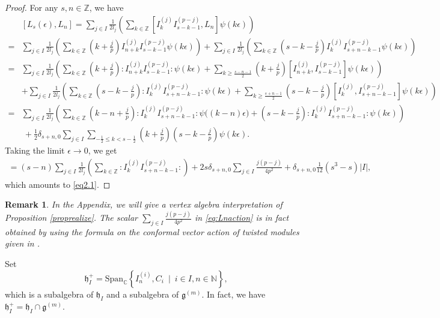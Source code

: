 \documentclass[12pt, reqno]{amsart}
\numberwithin{equation}{section}
\newtheorem{remark}[theorem]{Remark}%
\numberwithin{equation}{section}
\def\ep{\epsilon}
\def\dt{\delta}
\def\h{\mathfrak{h}}
\def\g{\mathfrak{g}}
\newcommand{\C}{\mathbb C}
\newcommand{\N}{\mathbb{N}}
\newcommand{\Z}{\mathbb{Z}}
\newcommand{\spanc}[1]{\mathrm{Span}_{\C}\left\{#1\right\}}
\newcommand{\elei}[2]{I_{#1}^{(#2)}}
\begin{document}
\begin{proof}
 For any $s,n\in\Z$, we have
 \begin{align*}
  &[L_s(\ep),L_n]=\sum_{j\in I}\frac{1}{2l_j}\left(\sum_{k\in \Z}
                 [\elei kj\elei{s-k-1}{p-j},L_n]\psi(k\ep)\right)\\
  =&\sum_{j\in I}\frac{1}{2l_j}\left(\sum_{k\in \Z}(k+\frac jp)
     \elei {n+k}j\elei{s-k-1}{p-j}\psi(k\ep)\right)+
     \sum_{j\in I}\frac{1}{2l_j}\left(\sum_{k\in \Z}(s-k-\frac jp)
      \elei {k}j\elei{s+n-k-1}{p-j}\psi(k\ep)\right)\\
  =&\sum_{j\in I}\frac{1}{2l_j}\left(\sum_{k\in \Z}(k+\frac jp)
                                :\elei {n+k}j\elei{s-k-1}{p-j}:\psi(k\ep)
                                +\sum_{k\geq\frac{s-n-1}2}(k+\frac jp)
          [\elei {n+k}j,\elei{s-k-1}{p-j}]\psi(k\ep)\right)\\
       &+\sum_{j\in I}\frac{1}{2l_j}\left(\sum_{k\in \Z}(s-k-\frac jp)
                                :\elei {k}j\elei{s+n-k-1}{p-j}:\psi(k\ep)
                                +\sum_{k\geq\frac{s+n-1}2}(s-k-\frac jp)
        [\elei {k}j,\elei{s+n-k-1}{p-j}]\psi(k\ep)\right)\\
  =&\sum_{j\in I}\frac{1}{2l_j}\left(\sum_{k\in \Z}(k-n+\frac jp)
      :\elei {k}j\elei{s+n-k-1}{p-j}:\psi\big((k-n)\ep\big)+(s-k-\frac jp)
      :\elei {k}j\elei{s+n-k-1}{p-j}:\psi(k\ep)\right)\\
          &\ +\frac12\dt_{s+n,0}
            \sum_{j\in I}\sum_{-\frac12\leq k<s-\frac12}
          (k+\frac jp)(s-k-\frac jp)\psi(k\ep).
 \end{align*}
 Taking the limit $\ep\rightarrow0$, we get
 \begin{align*}
  [L_s,L_n]=(s-n)\sum_{j\in I}\frac{1}{2l_j}\left(\sum_{k\in \Z}
                                :\elei {k}j\elei{s+n-k-1}{p-j}:\right)
    +2s\dt_{s+n,0}\sum_{j\in I}\frac{j(p-j)}{4p^2}+\dt_{s+n,0}\frac1{12}(s^3-s)|I|,
 \end{align*}
 which amounts to \eqref{eq2.1}.
\end{proof}

\begin{remark}
    In the Appendix, we will give a  vertex algebra  interpretation of Proposition \ref{proprealize}.
   The scalar $\sum_{j\in I}\frac{j(p-j)}{4p^2}$ in \eqref{eq:Lnaction} is in fact obtained by using the formula on the conformal vector action of twisted modules given in \cite[(1.14)]{KW}.
\end{remark}


Set
\[\h_I^+=\spanc{\elei ni,C_i\ \mid\ i\in I, n\in\N},\]
which is a subalgebra of $\h_I$ and a subalgebra of $\g^{(m)}$.
In fact, we have $\h_I^+=\h_I\cap \g^{(m)}$.
\end{document}
